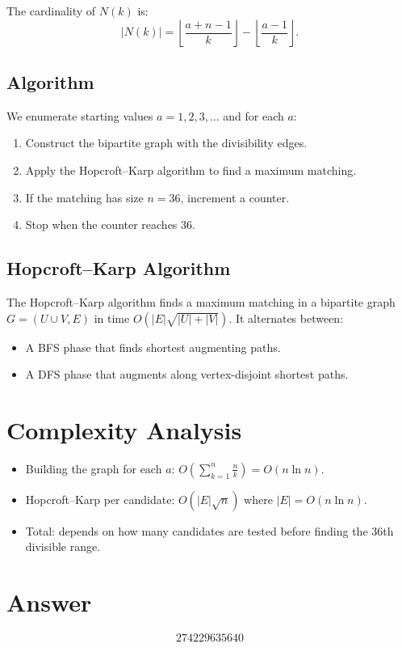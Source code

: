 \documentclass[12pt]{article}
\begin{document}
The cardinality of $N(k)$ is:
\[
|N(k)| = \left\lfloor \frac{a+n-1}{k} \right\rfloor - \left\lfloor \frac{a-1}{k} \right\rfloor .
\]

\subsection{Algorithm}

We enumerate starting values $a = 1, 2, 3, \ldots$ and for each $a$:
\begin{enumerate}
    \item Construct the bipartite graph with the divisibility edges.
    \item Apply the Hopcroft--Karp algorithm to find a maximum matching.
    \item If the matching has size $n = 36$, increment a counter.
    \item Stop when the counter reaches 36.
\end{enumerate}

\subsection{Hopcroft--Karp Algorithm}

The Hopcroft--Karp algorithm finds a maximum matching in a bipartite graph $G = (U \cup V, E)$ in time $O(|E| \sqrt{|U| + |V|})$. It alternates between:
\begin{itemize}
    \item A BFS phase that finds shortest augmenting paths.
    \item A DFS phase that augments along vertex-disjoint shortest paths.
\end{itemize}

\section{Complexity Analysis}

\begin{itemize}
    \item Building the graph for each $a$: $O\!\left(\sum_{k=1}^{n} \frac{n}{k}\right) = O(n \ln n)$.
    \item Hopcroft--Karp per candidate: $O(|E| \sqrt{n})$ where $|E| = O(n \ln n)$.
    \item Total: depends on how many candidates are tested before finding the 36th divisible range.
\end{itemize}

\section{Answer}

\[
\boxed{274229635640}
\]
\end{document}
